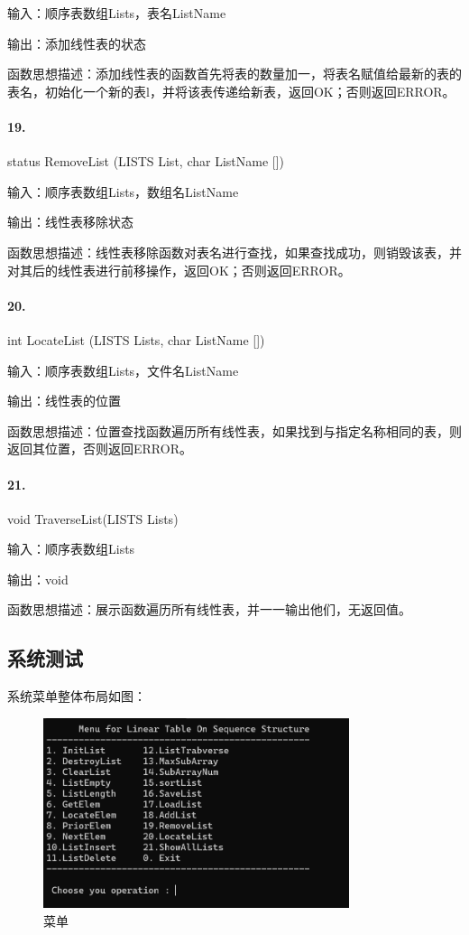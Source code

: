 \documentclass[supercite]{Experimental_Report}
\theoremstyle{definition}
\begin{document}
输入：顺序表数组Lists，表名ListName

输出：添加线性表的状态

函数思想描述：添加线性表的函数首先将表的数量加一，将表名赋值给最新的表的表名，初始化一个新的表l，并将该表传递给新表，返回OK；否则返回ERROR。

\paragraph{19.}status RemoveList (LISTS List, char ListName [])

输入：顺序表数组Lists，数组名ListName

输出：线性表移除状态

函数思想描述：线性表移除函数对表名进行查找，如果查找成功，则销毁该表，并对其后的线性表进行前移操作，返回OK；否则返回ERROR。

\paragraph{20.}int LocateList (LISTS Lists, char ListName [])

输入：顺序表数组Lists，文件名ListName

输出：线性表的位置

函数思想描述：位置查找函数遍历所有线性表，如果找到与指定名称相同的表，则返回其位置，否则返回ERROR。

\paragraph{21.}void TraverseList(LISTS Lists)

输入：顺序表数组Lists

输出：void

函数思想描述：展示函数遍历所有线性表，并一一输出他们，无返回值。

\subsection{系统测试}

系统菜单整体布局如图：

 \begin{figure}[H]
 	\centering
 	\includegraphics[width=0.8\textwidth]{images/菜单.png}
 	\caption{菜单}
 	\label{txlab}
 \end{figure}
\end{document}
